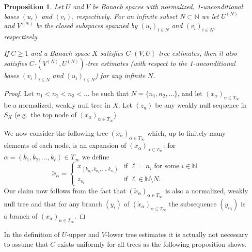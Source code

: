 \documentclass[11pt,leqno]{amsart}
\newtheorem{prop}[thm]{Proposition}
\theoremstyle{definition}
\newcommand{\N}{\mathbb{N}}
\newcommand{\xt}{\tilde x}
\begin{document}
\begin{prop}
  \label{tree-est}
  Let $U$ and $V$ be Banach spaces with normalized, 1-unconditional
  bases $(u_i)$ and $(v_i)$, respectively.  For an infinite subset
  $N\subset \N$ we let $U^{(N)}$ and $V^{(N)}$  be the closed
  subspaces spanned by $(u_{i})_{i\in N}$ and $(v_{i})_{i\in N}$,
  respectively.

  If $C\ge 1$ and a Banach space $X$ satisfies  $C$-$(V,U)$-tree
  estimates, then it also satisfies $C$-$(V^{(N)},U^{(N)})$-tree
  estimates (with respect to the 1-unconditional bases $(v_{i})_{i\in
    N}$ and $(u_{i})_{i\in N}$) for any infinite $N$.
\end{prop}
\begin{proof}
  Let $n_1<n_2<n_3<\ldots $ be such that $N=\{n_1,n_2,\ldots\}$, and
  let $(x_\alpha)_{\alpha\in T_\infty}$ be a normalized, weakly null
  tree in $X$. Let $(z_n)$ be any  weakly null sequence in $S_X$
  (e.g.~the top node of $(x_\alpha)_{\alpha\in T_\infty}$).
  
  We now consider
  the following tree  $(\xt_\alpha)_{\alpha\in T_\infty}$
  which, up to finitely many elements of each node, is an expansion
  of  $(x_\alpha)_{\alpha\in T_\infty}$: for
  $\alpha=(k_1,k_2,\ldots,k_\ell)\in T_\infty$ we define
  \begin{equation*}
    \xt_\alpha=\begin{cases}  x_{(k_{n_1},k_{n_2},\ldots,k_{n_i})}
    &\text{if $\ell=n_i$ for some $i\in\N$}\\
    z_{k_\ell}        &\text{if $\ell\in \N\setminus N$}.
    \end{cases}
  \end{equation*}
  Our claim now follows from the fact that
  $(\xt_\alpha)_{\alpha\in T_\infty}$ is also a  normalized, weakly
  null tree and that for any branch $(y_i)$ of
  $(\xt_\alpha)_{\alpha\in T_\infty}$ the subsequence $(y_{n_i})$ is a
  branch of $(x_\alpha)_{\alpha\in T_\infty}$.
\end{proof}

In the definition of $U$-upper and $V$-lower tree estimates it is
actually not necessary to assume that $C$ exists uniformly for all trees
as the following proposition shows.
\end{document}
